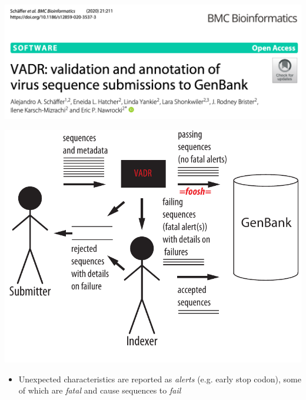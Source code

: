 \documentclass[landscape]{slides}
\begin{document}
\begin{slide}
\begin{center}
\includegraphics[width=6in]{figs/vadr-title-paper}

\includegraphics[width=6in]{figs/submission-schematic-5}
\end{center}

\small
\begin{itemize}
  \item Unexpected characteristics are reported as \emph{alerts}
    (e.g. early stop codon), some of which are \emph{fatal} and cause
    sequences to \emph{fail}
\end{itemize}



\vfill
\end{slide}
\end{document}
